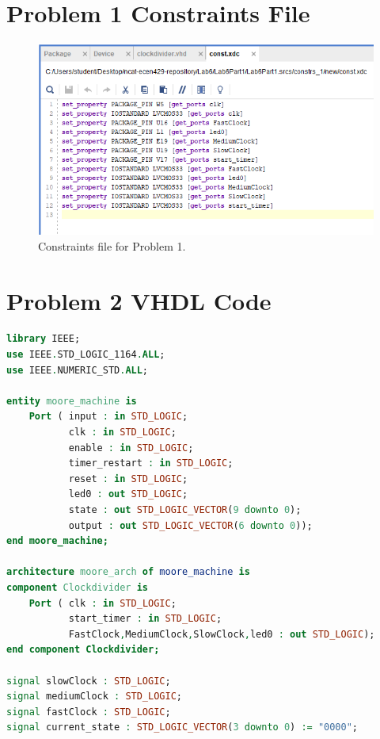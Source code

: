 \documentclass[11pt]{article}
\begin{document}
\begin{appendices}
\section{Problem 1 Constraints File}
\begin{center}
\begin{figure}
	\includegraphics[scale=1]{./images/Lab6Part1Const.png}
	\caption{\label{fig:Prob1Const}Constraints file for Problem 1.}
\end{figure}
\end{center}

\section{Problem 2 VHDL Code}
\begin{lstlisting}[language=VHDL]
library IEEE;
use IEEE.STD_LOGIC_1164.ALL;
use IEEE.NUMERIC_STD.ALL;

entity moore_machine is
    Port ( input : in STD_LOGIC;
           clk : in STD_LOGIC;
           enable : in STD_LOGIC;
           timer_restart : in STD_LOGIC;
           reset : in STD_LOGIC;
           led0 : out STD_LOGIC;
           state : out STD_LOGIC_VECTOR(9 downto 0);
           output : out STD_LOGIC_VECTOR(6 downto 0));
end moore_machine;

architecture moore_arch of moore_machine is
component Clockdivider is
    Port ( clk : in STD_LOGIC;
           start_timer : in STD_LOGIC;
           FastClock,MediumClock,SlowClock,led0 : out STD_LOGIC);
end component Clockdivider;

signal slowClock : STD_LOGIC;
signal mediumClock : STD_LOGIC;
signal fastClock : STD_LOGIC;
signal current_state : STD_LOGIC_VECTOR(3 downto 0) := "0000";


\end{lstlisting}
\end{appendices}
\end{document}
